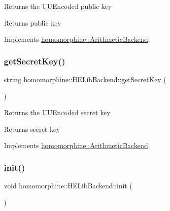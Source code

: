 Returns the U\+U\+Encoded public key

\begin{DoxyReturn}{Returns}
public key 
\end{DoxyReturn}


Implements \mbox{\hyperlink{classhomomorphine_1_1_arithmetic_backend_a26f31fc0c76cf58636972f68142b9a06}{homomorphine\+::\+Arithmetic\+Backend}}.

\mbox{\label{classhomomorphine_1_1_h_e_lib_backend_a57af39a901a44fef6aad76503739fde4}} 
\subsubsection{\texorpdfstring{getSecretKey()}{getSecretKey()}}
{\footnotesize\ttfamily string homomorphine\+::\+H\+E\+Lib\+Backend\+::get\+Secret\+Key (\begin{DoxyParamCaption}{ }\end{DoxyParamCaption})\hspace{0.3cm}{\ttfamily [virtual]}}

Returns the U\+U\+Encoded secret key

\begin{DoxyReturn}{Returns}
secret key 
\end{DoxyReturn}


Implements \mbox{\hyperlink{classhomomorphine_1_1_arithmetic_backend_a679abf60fea83922f7972498c4500252}{homomorphine\+::\+Arithmetic\+Backend}}.

\mbox{\label{classhomomorphine_1_1_h_e_lib_backend_a6a7e7c8095f2287c41f7d93be91418ec}} 
\subsubsection{\texorpdfstring{init()}{init()}}
{\footnotesize\ttfamily void homomorphine\+::\+H\+E\+Lib\+Backend\+::init (\begin{DoxyParamCaption}{ }\end{DoxyParamCaption})\hspace{0.3cm}{\ttfamily [virtual]}}

